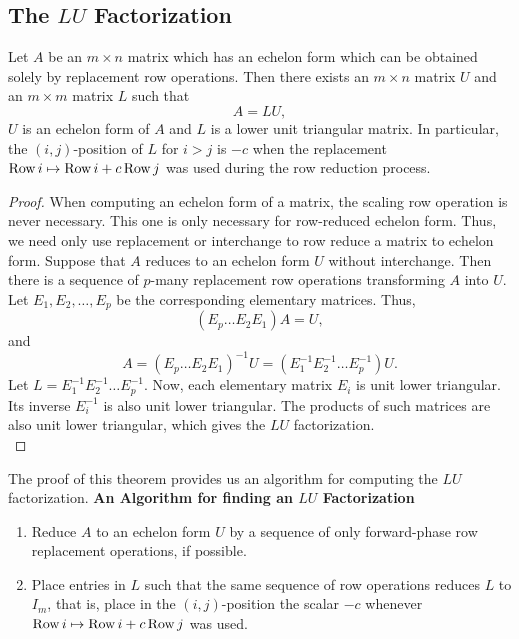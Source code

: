 \subsection{The $LU$ Factorization}
\begin{Thm} Let $A$ be an $m\times n$ matrix which has an echelon form which can be obtained solely by replacement row operations. Then there exists an $m\times n$ matrix $U$ and an $m\times m$ matrix $L$ such that 
\[A = LU,\] $U$ is an echelon form of $A$  and $L$ is a lower unit triangular matrix. In particular, the $(i,j)$-position of $L$ for $i> j$ is $-c$ when the replacement $\operatorname*{Row} i\mapsto \operatorname*{Row} i + c\operatorname*{Row} j$ was used during the row reduction process. 
\end{Thm}
\begin{proof}
When computing an echelon form of a matrix, the scaling row operation is never necessary. This one is only necessary for row-reduced echelon form. Thus, we need only use replacement or interchange to row reduce a matrix to echelon form. Suppose that $A$ reduces to an echelon form $U$ without interchange. Then there is a sequence of $p$-many replacement row operations transforming $A$ into $U$. Let $E_1, E_2, \ldots, E_p$ be the corresponding elementary matrices. Thus, 
\[(E_p\ldots E_2E_1)A = U,\] and \[A = (E_p\ldots E_2E_1)^{-1}U = (E_1^{-1}E_2^{-1}\ldots E_p^{-1})U.\] Let $L = E_1^{-1}E_2^{-1}\ldots E_p^{-1}$. Now, each elementary matrix $E_i$ is unit lower triangular. Its inverse $E_i^{-1}$ is also unit lower triangular. The products of such matrices are also unit lower triangular, which gives the $LU$ factorization.\\
\end{proof}

The proof of this theorem provides us an algorithm for computing the $LU$ factorization.
\noindent\textbf{An Algorithm for finding an $LU$ Factorization}
\begin{enumerate}[!LIST!,start=1]
\item Reduce $A$ to an echelon form $U$ by a sequence of only forward-phase row replacement operations, if possible.\\
\item Place entries in $L$ such that the same sequence of row operations reduces $L$ to $I_m$, that is, place in the $(i,j)$-position the scalar $-c$ whenever $\operatorname*{Row} i \mapsto \operatorname*{Row} i + c\operatorname*{Row} j$ was used. 
\end{enumerate}\vs

